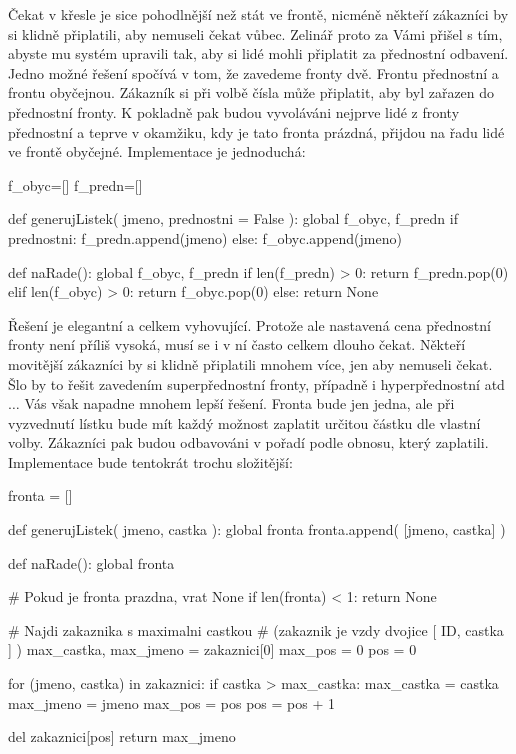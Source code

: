 Čekat v křesle je sice pohodlnější než stát ve frontě, nicméně někteří zákazníci by si klidně připlatili, aby nemuseli čekat vůbec. Zelinář proto
za Vámi přišel s tím, abyste mu systém upravili tak, aby si lidé mohli připlatit za přednostní odbavení. Jedno možné řešení spočívá v tom, že zavedeme
fronty dvě. Frontu přednostní a frontu obyčejnou. Zákazník si při volbě čísla může připlatit, aby byl zařazen do přednostní fronty. K pokladně pak budou
vyvoláváni nejprve lidé z fronty přednostní a teprve v okamžiku, kdy je tato fronta prázdná, přijdou na řadu lidé ve frontě obyčejné. Implementace
je jednoduchá:

\begin{python}
f_obyc=[]
f_predn=[]

def generujListek( jmeno, prednostni = False ):
    global f_obyc, f_predn
    if prednostni:
        f_predn.append(jmeno)
    else:
        f_obyc.append(jmeno)
    
def naRade():
    global f_obyc, f_predn
    if len(f_predn) > 0:
        return f_predn.pop(0)
    elif len(f_obyc) > 0:
        return f_obyc.pop(0)
    else:
        return None
\end{python}

Řešení je elegantní a celkem vyhovující. Protože ale nastavená cena přednostní fronty není příliš vysoká, musí se i v ní často celkem dlouho čekat. 
Někteří movitější zákazníci by si klidně připlatili mnohem více, jen aby nemuseli čekat. Šlo by to řešit zavedením superpřednostní fronty, případně
i hyperpřednostní atd $\ldots$ Vás však napadne mnohem lepší řešení. Fronta bude jen jedna, ale při vyzvednutí lístku bude mít každý možnost zaplatit
určitou částku dle vlastní volby. Zákazníci pak budou odbavováni v pořadí podle obnosu, který zaplatili. Implementace bude tentokrát trochu
složitější:


\begin{python}
fronta = []

def generujListek( jmeno, castka ):
    global fronta
    fronta.append( [jmeno, castka] )


def naRade():
    global fronta

    # Pokud je fronta prazdna, vrat None
    if len(fronta) < 1:
      return None
      
    # Najdi zakaznika s maximalni castkou
    # (zakaznik je vzdy dvojice [ ID, castka ] )
    max_castka, max_jmeno = zakaznici[0]
    max_pos    = 0
    pos        = 0
    
    for (jmeno, castka) in zakaznici:
        if castka > max_castka:
	    max_castka = castka
            max_jmeno = jmeno
            max_pos = pos
        pos = pos + 1
    
    del zakaznici[pos]
    return max_jmeno
\end{python}

